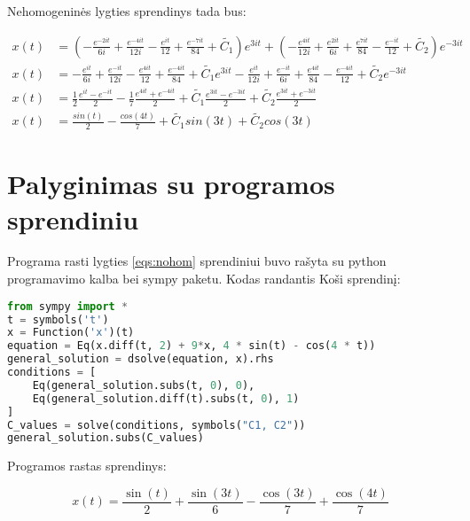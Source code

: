 \documentclass[11pt]{article}
\begin{document}
Nehomogeninės lygties sprendinys tada bus:

\begin{align*}
x(t)&=\left(-\frac{e^{-2it}}{6i}+\frac{e^{-4it}}{12i}-\frac{e^{it}}{12}+\frac{e^{-7it}}{84}+\tilde{C_1}\right)e^{3it}
+\left(-\frac{e^{4it}}{12i}+\frac{e^{2it}}{6i}+\frac{e^{7it}}{84}-\frac{e^{-it}}{12}+\tilde{C_2}\right)e^{-3it}\\
x(t)&=-\frac{e^{it}}{6i}+ \frac{e^{-it}}{12i}-\frac{e^{4it}}{12}+\frac{e^{-4it}}{84}+\tilde{C_1}e^{3it}
-\frac{e^{it}}{12i}+\frac{e^{-it}}{6i}+\frac{e^{4it}}{84}-\frac{e^{-4it}}{12}+\tilde{C_2}e^{-3it}\\
x(t)&=\frac{1}{2}\frac{e^{it}-e^{-it}}{2}-\frac{1}{7}\frac{e^{4it}+e^{-4it}}{2}+\tilde{C_1}\frac{e^{3it}-e^{-3it}}{2}+\tilde{C_2}\frac{e^{3it}+e^{-3it}}{2}\\
x(t)&=\frac{sin(t)}{2}-\frac{cos(4t)}{7}+\tilde{C_1}sin(3t)+\tilde{C_2}cos(3t)
\end{align*}

\section{Palyginimas su programos sprendiniu}

Programa rasti lygties \eqref{eqs:nohom} sprendiniui buvo rašyta su python programavimo
kalba bei sympy paketu. Kodas randantis Koši sprendinį:

\begin{lstlisting}[language=Python]
from sympy import *
t = symbols('t')
x = Function('x')(t)
equation = Eq(x.diff(t, 2) + 9*x, 4 * sin(t) - cos(4 * t))
general_solution = dsolve(equation, x).rhs
conditions = [
    Eq(general_solution.subs(t, 0), 0),
    Eq(general_solution.diff(t).subs(t, 0), 1)
]
C_values = solve(conditions, symbols("C1, C2"))
general_solution.subs(C_values)
\end{lstlisting}

Programos rastas sprendinys:

$$
x(t)=\frac{\sin(t)}{2}+\frac{\sin(3t)}{6}-\frac{\cos(3t)}{7}+\frac{\cos(4t)}{7}
$$
\end{document}

